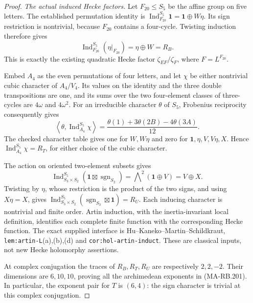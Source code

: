 \begin{proof}
\emph{The actual induced Hecke factors.}
Let \(F_{20}\le S_5\) be the affine group on five letters.
The established permutation identity is
\(\operatorname{Ind}_{F_{20}}^{S_5}\mathbf1=\mathbf1\oplus W\eta\).
Its sign restriction is nontrivial, because \(F_{20}\) contains
a four-cycle. Twisting induction therefore gives
\[
       \operatorname{Ind}_{F_{20}}^{S_5}(\eta|_{F_{20}})
                      =\eta\oplus W=R_B.
 \tag{MA-RB.206}
\]
This is exactly the existing quadratic Hecke factor
\(\zeta_{EF}/\zeta_F\), where \(F=L^{F_{20}}\).

Embed \(A_4\) as the even permutations of four letters,
and let \(\chi\) be either nontrivial cubic character
of \(A_4/V_4\). Its values on the identity and the three
double transpositions are one, and its sums over the two
four-element classes of three-cycles are \(4\omega\) and
\(4\omega^2\). For an irreducible character \(\theta\)
of \(S_5\), Frobenius reciprocity consequently gives
\[
 \left\langle\theta,\operatorname{Ind}_{A_4}^{S_5}\chi\right\rangle
   =\frac{\theta(1)+3\theta(2B)-4\theta(3A)}{12}.
 \tag{MA-RB.207}
\]
The checked character table gives one for \(W,W\eta\)
and zero for \(\mathbf1,\eta,V,V\eta,X\). Hence
\(\operatorname{Ind}_{A_4}^{S_5}\chi=R_T\), for either
choice of the cubic character.

The action on oriented two-element subsets gives
\[
 \operatorname{Ind}_{S_3\times S_2}^{S_5}
                     (\mathbf1\boxtimes\operatorname{sgn}_{S_2})
      =\bigwedge\nolimits^2(\mathbf1\oplus V)=V\oplus X.
 \tag{MA-RB.208}
\]
Twisting by \(\eta\), whose restriction is the product
of the two signs, and using \(X\eta=X\), gives
\(\operatorname{Ind}_{S_3\times S_2}^{S_5}
(\operatorname{sgn}_{S_3}\boxtimes\mathbf1)=R_U\).
Each inducing character is nontrivial and finite order.
Artin induction, with the inertia-invariant local definition,
identifies each complete finite function with the corresponding
Hecke function. The exact supplied interface is
Hu--Kaneko--Martin--Schildkraut, \texttt{lem:artin-L}(a),(b),(d)
and \texttt{cor:hol-artin-induct}. These are classical inputs,
not new Hecke holomorphy assertions.

At complex conjugation the traces of \(R_B,R_T,R_U\)
are respectively \(2,2,-2\). Their dimensions are
\(6,10,10\), proving all the archimedean exponents in
(MA-RB.201). In particular, the exponent pair for \(T\)
is \((6,4)\): the sign character is trivial at this
complex conjugation.


\end{proof}
